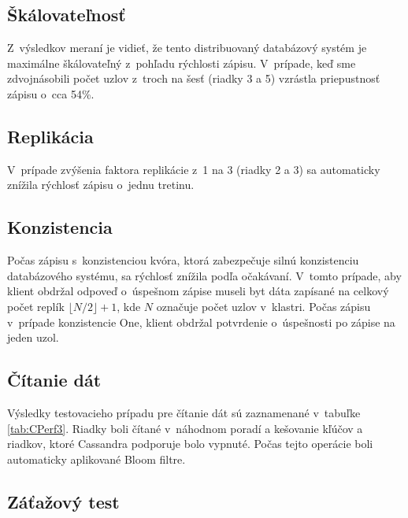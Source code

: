 \documentclass[11pt,twoside,a4paper]{book}
\begin{document}
\subsection*{Škálovateľnosť}

Z~výsledkov meraní je vidieť, že tento distribuovaný databázový systém je maximálne škálovateľný z~pohľadu rýchlosti zápisu. V~prípade, keď sme zdvojnásobili počet uzlov z~troch na šesť (riadky 3 a 5) vzrástla priepustnosť zápisu o~cca 54\%.

\subsection*{Replikácia}

V~prípade zvýšenia faktora replikácie z~1 na 3 (riadky 2 a 3) sa automaticky znížila rýchlosť zápisu o~jednu tretinu.

\subsection*{Konzistencia}

Počas zápisu s~konzistenciou kvóra, ktorá zabezpečuje silnú konzistenciu databázového systému, sa rýchlosť znížila podľa očakávaní. V~tomto prípade, aby klient obdržal odpoveď o~úspešnom zápise museli byt dáta zapísané na celkový počet replík $\lfloor N/2 \rfloor + 1$, kde $N$ označuje počet uzlov v~klastri. Počas zápisu v~prípade konzistencie One, klient obdržal potvrdenie o~úspešnosti po zápise na jeden uzol.

\subsection*{Čítanie dát}

Výsledky testovacieho prípadu pre čítanie dát sú zaznamenané v~tabuľke \ref{tab:CPerf3}. Riadky boli čítané v~náhodnom poradí a kešovanie kľúčov a riadkov, ktoré Cassandra podporuje bolo vypnuté. Počas tejto operácie boli automaticky aplikované Bloom filtre.



\subsection*{Záťažový test}
\end{document}
